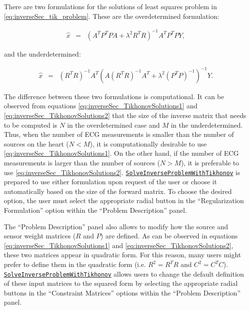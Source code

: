     There are two formulations for the solutions of least squares problem in \autoref{eq:inverseSec_tik_problem}.
    These are the overdetermined formulation:
    \begin{center}
    \begin{eqnarray}
        \hat{x}   &=& \left(A^T P^TPA + \lambda^{2}R^TR\right)^{-1} A^T P^TP Y,
    \label{eq:inverseSec_TikhonovSolutions1}
    \end{eqnarray}
    \end{center}    
    and the underdetermined:
    \begin{center}
    \begin{eqnarray}
        \hat{x}  &=& (R^TR)^{-1} A^T \left( A(R^TR)^{-1}A^T + \lambda^2 (P^TP)^{-1}  \right)^{-1}Y.
    \label{eq:inverseSec_TikhonovSolutions2}
    \end{eqnarray}
    \end{center}
    The difference between these two formulations is computational. 
    It can be observed from equations \ref{eq:inverseSec_TikhonovSolutions1} and \ref{eq:inverseSec_TikhonovSolutions2} that the size of the inverse matrix that needs to be computed is $N$ in the overdetermined case and $M$ in the underdetermined.
    Thus, when the number of ECG measurements is smaller than the number of sources on the heart ($N<M$), it is computationally desirable to use \autoref{eq:inverseSec_TikhonovSolutions1}.
    On the other hand, if the number of ECG measurements is larger than the number of sources ($N>M$), it is preferable to use \autoref{eq:inverseSec_TikhonovSolutions2}.
    \href{http://scirundocwiki.sci.utah.edu/SCIRunDocs/index.php/CIBC:Documentation:SCIRun:Reference:BioPSE:SolveInverseProblemWithTikhonov}{{\tt SolveInverseProblemWithTikhonov}} is prepared to use either formulation upon request of the user or choose it automatically based on the size of the forward matrix.
    To choose the desired option, the user must select the appropriate radial button in the ``Regularization Formulation'' option within the  ``Problem Description'' panel.
    
    The ``Problem Description'' panel also allows to modify how the source and sensor weight matrices ($R$ and $P$) are defined.
    As can be observed in equations \ref{eq:inverseSec_TikhonovSolutions1} and \ref{eq:inverseSec_TikhonovSolutions2}, these two matrices appear in quadratic form. For this reason, many users might prefer to define them in the quadratic form (i.e. $R^2=R^TR$ and $C^2=C^TC$).
    \href{http://scirundocwiki.sci.utah.edu/SCIRunDocs/index.php/CIBC:Documentation:SCIRun:Reference:BioPSE:SolveInverseProblemWithTikhonov}{{\tt SolveInverseProblemWithTikhonov}} allows users to change the default definition of these input matrices to the squared form by selecting the appropriate radial buttons in the ``Constraint Matrices'' options within the  ``Problem Description'' panel.
    
